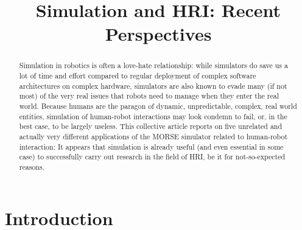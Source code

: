 \documentclass[conference]{IEEEtran}
\begin{document}
\title{Simulation and HRI: Recent Perspectives}

\author{}


\maketitle

\begin{abstract}

Simulation in robotics is often a love-hate relationship: while simulators do
save us a lot of time and effort compared to regular deployment of complex
software architectures on complex hardware, simulators are also known to evade
many (if not most) of the very real issues that robots need to manage when they
enter the real world.  Because humans are the paragon of dynamic, unpredictable,
complex, real world entities, simulation of human-robot interactions may look
condemn to fail, or, in the best case, to be largely useless.  This collective
article reports on five unrelated and actually very different applications of
the MORSE simulator related to human-robot interaction: It appears that
simulation is already useful (and even essential in some case) to successfully
carry out research in the field of HRI, be it for not-so-expected reasons.

\end{abstract}

\IEEEpeerreviewmaketitle

\section{Introduction}
\end{document}
